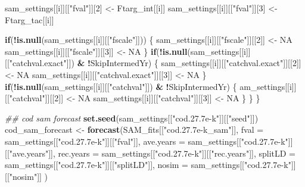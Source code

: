 \documentclass[
]{article}
\newenvironment{Shaded}{\begin{snugshade}}{\end{snugshade}}
\newcommand{\CommentTok}[1]{\textcolor[rgb]{0.56,0.35,0.01}{\textit{#1}}}
\newcommand{\ControlFlowTok}[1]{\textcolor[rgb]{0.13,0.29,0.53}{\textbf{#1}}}
\newcommand{\DataTypeTok}[1]{\textcolor[rgb]{0.13,0.29,0.53}{#1}}
\newcommand{\DecValTok}[1]{\textcolor[rgb]{0.00,0.00,0.81}{#1}}
\newcommand{\KeywordTok}[1]{\textcolor[rgb]{0.13,0.29,0.53}{\textbf{#1}}}
\newcommand{\NormalTok}[1]{#1}
\newcommand{\OperatorTok}[1]{\textcolor[rgb]{0.81,0.36,0.00}{\textbf{#1}}}
\newcommand{\OtherTok}[1]{\textcolor[rgb]{0.56,0.35,0.01}{#1}}
\newcommand{\StringTok}[1]{\textcolor[rgb]{0.31,0.60,0.02}{#1}}
\begin{document}
\begin{Shaded}
\begin{Highlighting}[]
{{{\NormalTok{                sam_settings[[i]][[}\StringTok{"fval"}\NormalTok{]][}\DecValTok{2}\NormalTok{] <-}\StringTok{ }\NormalTok{Ftarg_int[[i]]}
\NormalTok{            sam_settings[[i]][[}\StringTok{"fval"}\NormalTok{]][}\DecValTok{3}\NormalTok{] <-}\StringTok{ }\NormalTok{Ftarg_tac[[i]]}
            
            \ControlFlowTok{if}\NormalTok{(}\OperatorTok{!}\KeywordTok{is.null}\NormalTok{(sam_settings[[i]][[}\StringTok{"fscale"}\NormalTok{]])) \{}
\NormalTok{            sam_settings[[i]][[}\StringTok{"fscale"}\NormalTok{]][[}\DecValTok{2}\NormalTok{]] <-}\StringTok{ }\OtherTok{NA}
\NormalTok{            sam_settings[[i]][[}\StringTok{"fscale"}\NormalTok{]][[}\DecValTok{3}\NormalTok{]] <-}\StringTok{ }\OtherTok{NA}
\NormalTok{            \}}
            \ControlFlowTok{if}\NormalTok{(}\OperatorTok{!}\KeywordTok{is.null}\NormalTok{(sam_settings[[i]][[}\StringTok{"catchval.exact"}\NormalTok{]]) }\OperatorTok{&}\StringTok{ }\OperatorTok{!}\NormalTok{SkipIntermedYr) \{}
\NormalTok{            sam_settings[[i]][[}\StringTok{"catchval.exact"}\NormalTok{]][[}\DecValTok{2}\NormalTok{]] <-}\StringTok{ }\OtherTok{NA}
\NormalTok{            sam_settings[[i]][[}\StringTok{"catchval.exact"}\NormalTok{]][[}\DecValTok{3}\NormalTok{]] <-}\StringTok{ }\OtherTok{NA}
\NormalTok{            \}}
            \ControlFlowTok{if}\NormalTok{(}\OperatorTok{!}\KeywordTok{is.null}\NormalTok{(sam_settings[[i]][[}\StringTok{"catchval"}\NormalTok{]]) }\OperatorTok{&}\StringTok{ }\OperatorTok{!}\NormalTok{SkipIntermedYr) \{}
\NormalTok{            am_settings[[i]][[}\StringTok{"catchval"}\NormalTok{]][[}\DecValTok{2}\NormalTok{]] <-}\StringTok{ }\OtherTok{NA}
\NormalTok{            sam_settings[[i]][[}\StringTok{"catchval"}\NormalTok{]][[}\DecValTok{3}\NormalTok{]] <-}\StringTok{ }\OtherTok{NA}
\NormalTok{            \}}
\NormalTok{            \}}
\NormalTok{        \}}
        
        \CommentTok{## cod sam forecast}
        \KeywordTok{set.seed}\NormalTok{(sam_settings[[}\StringTok{"cod.27.7e-k"}\NormalTok{]][[}\StringTok{"seed"}\NormalTok{]])}
\NormalTok{        cod_sam_forecast <-}\StringTok{ }\KeywordTok{forecast}\NormalTok{(SAM_fits[[}\StringTok{"cod.27.7e-k_sam"}\NormalTok{]], }
                         \DataTypeTok{fval =}\NormalTok{ sam_settings[[}\StringTok{"cod.27.7e-k"}\NormalTok{]][[}\StringTok{"fval"}\NormalTok{]],}
                         \DataTypeTok{ave.years =}\NormalTok{ sam_settings[[}\StringTok{"cod.27.7e-k"}\NormalTok{]][[}\StringTok{"ave.years"}\NormalTok{]],}
                         \DataTypeTok{rec.years =}\NormalTok{ sam_settings[[}\StringTok{"cod.27.7e-k"}\NormalTok{]][[}\StringTok{"rec.years"}\NormalTok{]],}
                         \DataTypeTok{splitLD =}\NormalTok{ sam_settings[[}\StringTok{"cod.27.7e-k"}\NormalTok{]][[}\StringTok{"splitLD"}\NormalTok{]],}
                         \DataTypeTok{nosim =}\NormalTok{ sam_settings[[}\StringTok{"cod.27.7e-k"}\NormalTok{]][[}\StringTok{"nosim"}\NormalTok{]]}
\NormalTok{        )}
        
}}}
\end{Highlighting}
\end{Shaded}
\end{document}

